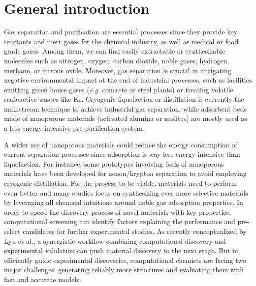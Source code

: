 
\chapter*{General introduction}









Gas separation and purification are essential processes since they provide key reactants and inert gases for the chemical industry, as well as medical or food grade gases. Among them, we can find easily extractable or synthesizable molecules such as nitrogen, oxygen, carbon dioxide, noble gases, hydrogen, methane, or nitrous oxide. Moreover, gas separation is crucial in mitigating negative environmental impact at the end of industrial processes, such as facilities emitting green house gases (\emph{e.g.} concrete or steel plants) or treating volatile radioactive wastes like Kr. Cryogenic liquefaction or distillation is currently the mainstream technique to achieve industrial gas separation, while adsorbent beds made of nanoporous materials (activated alumina or zeolites) are mostly used as a less energy-intensive pre-purification system.\autocite{kerry2007industrial}

A wider use of nanoporous materials could reduce the energy consumption of current separation processes since adsorption is way less energy intensive than liquefaction.\autocite{national2019research} For instance, some prototypes involving beds of nanoporous materials have been developed for xenon/krypton separation to avoid employing cryogenic distillation.\autocite{Banerjee2018} For the process to be viable, materials need to perform even better and many studies focus on synthesizing ever more selective materials by leveraging all chemical intuitions around noble gas adsorption properties.\autocite{Chen_2014, Li_2019, Pei_2022} In order to speed the discovery process of novel materials with key properties, computational screening can identify factors explaining the performance and pre-select candidates for further experimental studies. As recently conceptualized by Lyu et al., a synergistic workflow combining computational discovery and experimental validation can push material discovery to the next stage.\autocite{Lyu_2020, Jablonka_2022} But to efficiently guide experimental discoveries, computational chemists are facing two major challenges: generating reliably more structures and evaluating them with fast and accurate models.

